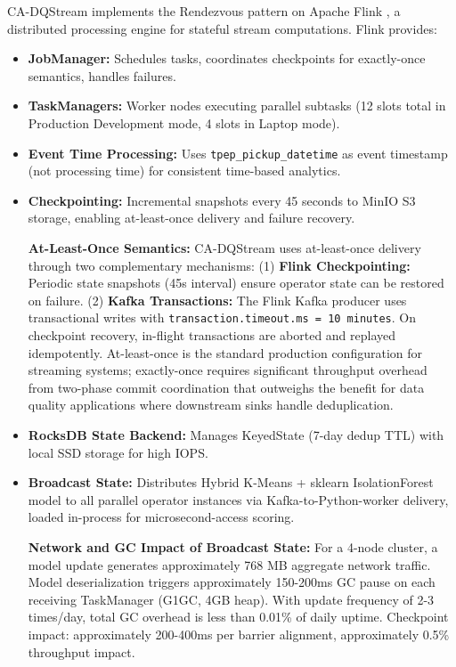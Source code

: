 CA-DQStream implements the Rendezvous pattern on Apache Flink \citep{flinkdocs2024}, a distributed processing engine for stateful stream computations. Flink provides:

\begin{itemize}
    \item \textbf{JobManager:} Schedules tasks, coordinates checkpoints for exactly-once semantics, handles failures.
    \item \textbf{TaskManagers:} Worker nodes executing parallel subtasks (12 slots total in Production Development mode, 4 slots in Laptop mode).
    \item \textbf{Event Time Processing:} Uses \texttt{tpep\_pickup\_datetime} as event timestamp (not processing time) for consistent time-based analytics.
    \item \textbf{Checkpointing:} Incremental snapshots every 45 seconds to MinIO S3 storage, enabling at-least-once delivery and failure recovery.

\textbf{At-Least-Once Semantics:} CA-DQStream uses at-least-once delivery through two complementary mechanisms: (1) \textbf{Flink Checkpointing:} Periodic state snapshots (45s interval) ensure operator state can be restored on failure. (2) \textbf{Kafka Transactions:} The Flink Kafka producer uses transactional writes with \texttt{transaction.timeout.ms = 10 minutes}. On checkpoint recovery, in-flight transactions are aborted and replayed idempotently. At-least-once is the standard production configuration for streaming systems; exactly-once requires significant throughput overhead from two-phase commit coordination that outweighs the benefit for data quality applications where downstream sinks handle deduplication.
    \item \textbf{RocksDB State Backend:} Manages KeyedState (7-day dedup TTL) with local SSD storage for high IOPS.
    \item \textbf{Broadcast State:} Distributes Hybrid K-Means + sklearn IsolationForest model to all parallel operator instances via Kafka-to-Python-worker delivery, loaded in-process for microsecond-access scoring.

\textbf{Network and GC Impact of Broadcast State:} For a 4-node cluster, a model update generates approximately 768 MB aggregate network traffic. Model deserialization triggers approximately 150-200ms GC pause on each receiving TaskManager (G1GC, 4GB heap). With update frequency of 2-3 times/day, total GC overhead is less than 0.01\% of daily uptime. Checkpoint impact: approximately 200-400ms per barrier alignment, approximately 0.5\% throughput impact.


\end{itemize}
